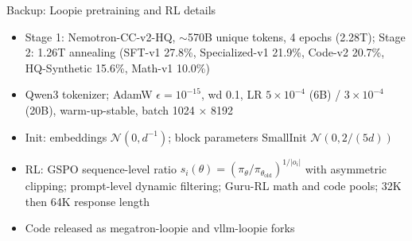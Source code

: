 \documentclass[aspectratio=169,10pt]{beamer}
\begin{document}
\begin{frame}{Backup: Loopie pretraining and RL details}
  \begin{itemize}
    \item Stage 1: Nemotron-CC-v2-HQ, $\sim$570B unique tokens, 4 epochs (2.28T); Stage 2: 1.26T annealing (SFT-v1 27.8\%, Specialized-v1 21.9\%, Code-v2 20.7\%, HQ-Synthetic 15.6\%, Math-v1 10.0\%)
    \item Qwen3 tokenizer; AdamW $\epsilon{=}10^{-15}$, wd 0.1, LR $5\times10^{-4}$ (6B) / $3\times10^{-4}$ (20B), warm-up-stable, batch 1024 $\times$ 8192
    \item Init: embeddings $\mathcal N(0, d^{-1})$; block parameters SmallInit $\mathcal N(0, 2/(5d))$
    \item RL: GSPO sequence-level ratio $s_i(\theta) = (\pi_\theta/\pi_{\theta_{\text{old}}})^{1/|o_i|}$ with asymmetric clipping; prompt-level dynamic filtering; Guru-RL math and code pools; 32K then 64K response length
    \item Code released as megatron-loopie and vllm-loopie forks
  \end{itemize}
\end{frame}
\end{document}
